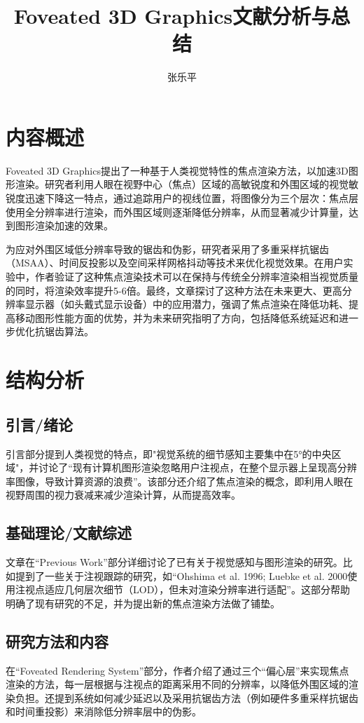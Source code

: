 \documentclass{ctexart}
\title{Foveated 3D Graphics文献分析与总结}
\author{张乐平}
\begin{document}
	\maketitle
	\section{内容概述}
	Foveated 3D Graphics提出了一种基于人类视觉特性的焦点渲染方法，以加速3D图形渲染。研究者利用人眼在视野中心（焦点）区域的高敏锐度和外围区域的视觉敏锐度迅速下降这一特点，通过追踪用户的视线位置，将图像分为三个层次：焦点层使用全分辨率进行渲染，而外围区域则逐渐降低分辨率，从而显著减少计算量，达到图形渲染加速的效果。
	
	为应对外围区域低分辨率导致的锯齿和伪影，研究者采用了多重采样抗锯齿（MSAA）、时间反投影以及空间采样网格抖动等技术来优化视觉效果。在用户实验中，作者验证了这种焦点渲染技术可以在保持与传统全分辨率渲染相当视觉质量的同时，将渲染效率提升5-6倍。最终，文章探讨了这种方法在未来更大、更高分辨率显示器（如头戴式显示设备）中的应用潜力，强调了焦点渲染在降低功耗、提高移动图形性能方面的优势，并为未来研究指明了方向，包括降低系统延迟和进一步优化抗锯齿算法。
	\section{结构分析}
		\subsection{引言/绪论}
		引言部分提到人类视觉的特点，即"视觉系统的细节感知主要集中在5°的中央区域"，并讨论了“现有计算机图形渲染忽略用户注视点，在整个显示器上呈现高分辨率图像，导致计算资源的浪费”​。该部分还介绍了焦点渲染的概念，即利用人眼在视野周围的视力衰减来减少渲染计算，从而提高效率。
		\subsection{基础理论/文献综述}
		文章在“Previous Work”部分详细讨论了已有关于视觉感知与图形渲染的研究。比如提到了一些关于注视跟踪的研究，如“Ohshima et al. 1996; Luebke et al. 2000使用注视点适应几何层次细节（LOD），但未对渲染分辨率进行适配”​。这部分帮助明确了现有研究的不足，并为提出新的焦点渲染方法做了铺垫。
		\subsection{研究方法和内容}
		在“Foveated Rendering System”部分，作者介绍了通过三个“偏心层”来实现焦点渲染的方法，每一层根据与注视点的距离采用不同的分辨率，以降低外围区域的渲染负担。还提到系统如何减少延迟以及采用抗锯齿方法（例如硬件多重采样抗锯齿和时间重投影）来消除低分辨率层中的伪影。
\end{document}
